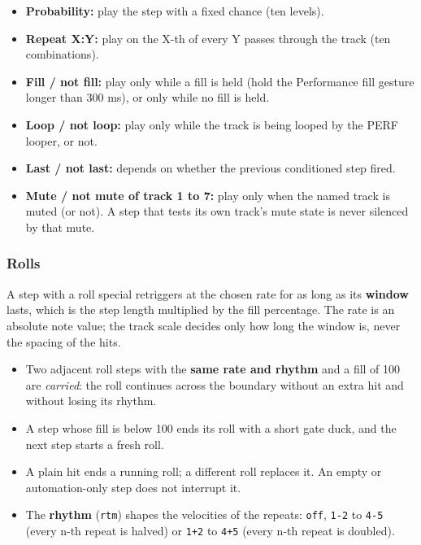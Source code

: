\begin{itemize}
\tightlist
\item
  \textbf{Probability:} play the step with a fixed chance (ten levels).
\item
  \textbf{Repeat X:Y:} play on the X-th of every Y passes through the
  track (ten combinations).
\item
  \textbf{Fill / not fill:} play only while a fill is held (hold the
  Performance fill gesture longer than 300 ms), or only while no fill is
  held.
\item
  \textbf{Loop / not loop:} play only while the track is being looped by
  the PERF looper, or not.
\item
  \textbf{Last / not last:} depends on whether the previous conditioned
  step fired.
\item
  \textbf{Mute / not mute of track 1 to 7:} play only when the named
  track is muted (or not). A step that tests its own track's mute state
  is never silenced by that mute.
\end{itemize}


\subsubsection{Rolls}\label{rolls}

A step with a roll special retriggers at the chosen rate for as long as
its \textbf{window} lasts, which is the step length multiplied by the
fill percentage. The rate is an absolute note value; the track scale
decides only how long the window is, never the spacing of the hits.

\begin{itemize}
\tightlist
\item
  Two adjacent roll steps with the \textbf{same rate and rhythm} and a
  fill of 100 are \emph{carried}: the roll continues across the boundary
  without an extra hit and without losing its rhythm.
\item
  A step whose fill is below 100 ends its roll with a short gate duck,
  and the next step starts a fresh roll.
\item
  A plain hit ends a running roll; a different roll replaces it. An
  empty or automation-only step does not interrupt it.
\item
  The \textbf{rhythm} (\texttt{rtm}) shapes the velocities of the
  repeats: \texttt{off}, \texttt{1-2} to \texttt{4-5} (every n-th repeat
  is halved) or \texttt{1+2} to \texttt{4+5} (every n-th repeat is
  doubled).
\end{itemize}

